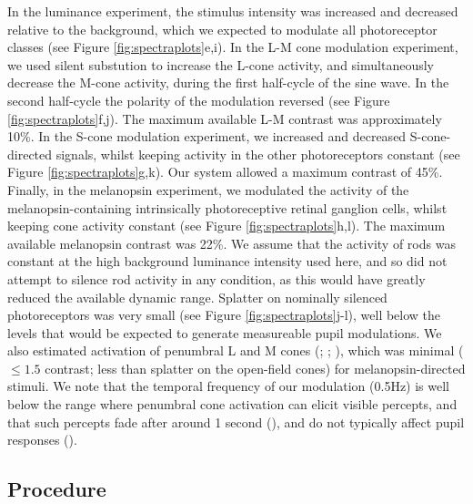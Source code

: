 \documentclass[
]{article}
\begin{document}
In the luminance experiment, the stimulus intensity was increased and decreased relative to the background, which we expected to modulate all photoreceptor classes (see Figure \ref{fig:spectraplots}e,i). In the L-M cone modulation experiment, we used silent substution to increase the L-cone activity, and simultaneously decrease the M-cone activity, during the first half-cycle of the sine wave. In the second half-cycle the polarity of the modulation reversed (see Figure \ref{fig:spectraplots}f,j). The maximum available L-M contrast was approximately 10\%. In the S-cone modulation experiment, we increased and decreased S-cone-directed signals, whilst keeping activity in the other photoreceptors constant (see Figure \ref{fig:spectraplots}g,k). Our system allowed a maximum contrast of 45\%. Finally, in the melanopsin experiment, we modulated the activity of the melanopsin-containing intrinsically photoreceptive retinal ganglion cells, whilst keeping cone activity constant (see Figure \ref{fig:spectraplots}h,l). The maximum available melanopsin contrast was 22\%. We assume that the activity of rods was constant at the high background luminance intensity used here, and so did not attempt to silence rod activity in any condition, as this would have greatly reduced the available dynamic range. Splatter on nominally silenced photoreceptors was very small (see Figure \ref{fig:spectraplots}j-l), well below the levels that would be expected to generate measureable pupil modulations. We also estimated activation of penumbral L and M cones (; ; ), which was minimal (\(\le 1.5%
\) contrast; less than splatter on the open-field cones) for melanopsin-directed stimuli. We note that the temporal frequency of our modulation (0.5Hz) is well below the range where penumbral cone activation can elicit visible percepts, and that such percepts fade after around 1 second (), and do not typically affect pupil responses ().

\subsection{Procedure}\label{procedure}
\end{document}

